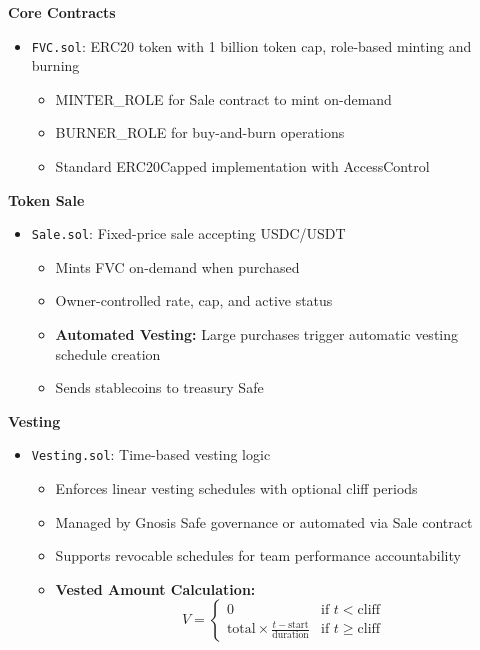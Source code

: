 \documentclass[
  paper=a4,
  ,captions=tableheading
]{scrartcl}
\newcommand{\passthrough}[1]{#1}
\providecommand{\tightlist}{%
  \setlength{\itemsep}{0pt}\setlength{\parskip}{0pt}}
\begin{document}
\textbf{Core Contracts}

\begin{itemize}
\tightlist
\item
  \passthrough{\lstinline!FVC.sol!}: ERC20 token with 1 billion token cap, role-based minting and burning
  \begin{itemize}
  \tightlist
  \item
    MINTER\_ROLE for Sale contract to mint on-demand
  \item
    BURNER\_ROLE for buy-and-burn operations
  \item
    Standard ERC20Capped implementation with AccessControl
  \end{itemize}
\end{itemize}

\textbf{Token Sale}

\begin{itemize}
\tightlist
\item
  \passthrough{\lstinline!Sale.sol!}: Fixed-price sale accepting USDC/USDT
  \begin{itemize}
  \tightlist
  \item
    Mints FVC on-demand when purchased
  \item
    Owner-controlled rate, cap, and active status
  \item
    \textbf{Automated Vesting:} Large purchases trigger automatic vesting schedule creation
  \item
    Sends stablecoins to treasury Safe
  \end{itemize}
\end{itemize}

\textbf{Vesting}

\begin{itemize}
\tightlist
\item
  \passthrough{\lstinline!Vesting.sol!}: Time-based vesting logic
  \begin{itemize}
  \tightlist
  \item
    Enforces linear vesting schedules with optional cliff periods
  \item
    Managed by Gnosis Safe governance or automated via Sale contract
  \item
    Supports revocable schedules for team performance accountability
  \item
    \textbf{Vested Amount Calculation:}
    \[
    V = \begin{cases}
    0 & \text{if } t < \text{cliff} \\
    \text{total} \times \frac{t - \text{start}}{\text{duration}} & \text{if } t \geq \text{cliff}
    \end{cases}
    \]
  \end{itemize}
\end{itemize}
\end{document}
